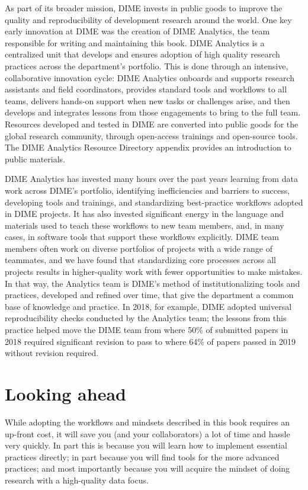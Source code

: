 {As part of its broader mission, DIME invests in public goods
to improve the quality and reproducibility of development research around the world.
One key early innovation at DIME was the creation of DIME Analytics,
the team responsible for writing and maintaining this book.
DIME Analytics is a centralized unit that develops and ensures adoption
of high quality research practices across the department's portfolio.
This is done through an intensive, collaborative innovation cycle:
DIME Analytics onboards and supports research assistants and field coordinators,
provides standard tools and workflows to all teams,
delivers hands-on support when new tasks or challenges arise,
and then develops and integrates lessons from those engagements to bring to the full team.
Resources developed and tested in DIME are converted into public goods
for the global research community, through open-access trainings and open-source tools.
The DIME Analytics Resource Directory appendix provides an introduction to public materials.

DIME Analytics has invested many hours over the past years
learning from data work across DIME's portfolio,
identifying inefficiencies and barriers to success,
developing tools and trainings, and standardizing best-practice workflows adopted in DIME projects.
It has also invested significant energy in the language and materials
used to teach these workflows to new team members,
and, in many cases, in software tools that support these workflows explicitly.
DIME team members often work on diverse portfolios of projects
with a wide range of teammates, and we have found
that standardizing core processes across all projects
results in higher-quality work with fewer opportunities to make mistakes.
In that way, the Analytics team is DIME's method of institutionalizing
tools and practices, developed and refined over time,
that give the department a common base of knowledge and practice.
In 2018, for example, DIME adopted universal reproducibility checks
conducted by the Analytics team;
the lessons from this practice helped move the DIME team
from where 50\% of submitted papers in 2018
required significant revision to pass
to where 64\% of papers passed in 2019 without revision required.


\section{Looking ahead}
While adopting the workflows and mindsets described in this book requires an up-front cost,
it will save you (and your collaborators) a lot of time and hassle very quickly.
In part this is because you will learn how to implement essential practices directly;
in part because you will find tools for the more advanced practices;
and most importantly because you will acquire the mindset of doing research with a high-quality data focus.

}
